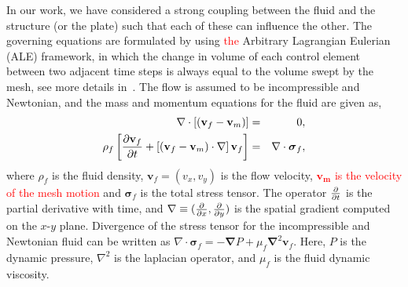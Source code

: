 \documentclass[aps,pre,twocolumn,aps,longbibliography]{revtex4-1}
\begin{document}
	In our work, we have considered a strong coupling between the fluid and the structure (or the plate) such that each of these can influence the other. The governing equations are formulated by using \textcolor{red}{the} Arbitrary Lagrangian Eulerian (ALE) framework, in which the change in volume of each control element between two adjacent time steps is always equal to the volume swept by the mesh, see more details in~\cite{Nguyen2010, Slone2002, CampbellPaterson2011}. The flow is assumed to be incompressible and Newtonian, and the mass and momentum equations for the fluid are given as,
	\begin{eqnarray}
	\nabla\cdot\left[(\mathbf{v}_f-\mathbf{v}_m)\right] &=& 0, \\
	\rho_f\left[{\partial\mathbf{v}_f\over\partial t}+\left[(\mathbf{v}_f-\mathbf{v}_m)\cdot\mathbf{\nabla}\right]\mathbf{v}_f\right] &=& \mathbf{\nabla}\cdot\mathbf{\boldsymbol{\sigma}}_f,
	\end{eqnarray}
	where $\rho_f$ is the fluid density, $\mathbf{v}_f=(v_x,v_y)$ is the flow velocity, \textcolor{red}{$\mathbf{v_m}$ is the velocity of the mesh motion} and $\boldsymbol{\sigma}_f$ is the total stress tensor. The operator ${\partial\over\partial t}$ is the partial derivative with time, and $\mathbf{\nabla}\equiv ({\partial\over\partial x},{\partial\over\partial y})$ is the spatial gradient computed on the $x$-$y$ plane. Divergence of the stress tensor for the incompressible and Newtonian fluid can be written as $\nabla\cdot\boldsymbol{\sigma}_f=-\mathbf{\nabla}P+\mu_f\mathbf{\nabla}^2\mathbf{v}_f$. Here, $P$ is the dynamic pressure, $\nabla^2$ is the laplacian operator, and $\mu_f$ is the fluid dynamic viscosity. 
	
\end{document}
